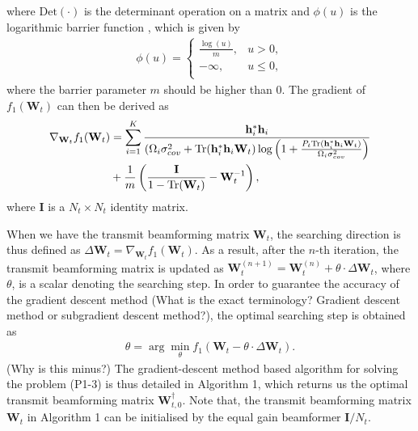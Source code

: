 \documentclass[12pt,draftcls,onecolumn,journal]{IEEEtran}
\begin{document}
where $\text{Det}(\cdot)$ is the determinant operation on a matrix and $\phi(u)$ is the logarithmic barrier function \cite{convex}, which is given by
\begin{align}
	\phi(u)=\left\{
	\begin{array}{ll}
		\displaystyle{\frac{\log(u)}{m}}, & u > 0, \\
		-\infty, & u \leq 0, \\
	\end{array}
	\right. \label{eq:Barrier}
\end{align}
where the barrier parameter $m$ should be higher than 0. The gradient of $f_1(\mathbf{W}_t)$ can then be derived as
\begin{align}
	\nabla_{\mathbf{W}_t}f_1(\mathbf{W}_t) & = \sum_{i=1}^K\frac{\mathbf{h}_i^*\mathbf{h}_i}{(\Omega_i\sigma_{cov}^2 + \text{Tr}(\mathbf{h}_i^*\mathbf{h}_i\mathbf{W}_t)\log\left(1 + \frac{P_t\text{Tr}(\mathbf{h}_i^*\mathbf{h}_i\mathbf{W}_t)}{\Omega_i\sigma_{cov}^2}\right)} \notag \\
& + \frac{1}{m}\left(\frac{\mathbf{I}}{1 - \text{Tr}(\mathbf{W}_t)} - \mathbf{W}_t^{-1}\right), \label{eq:GradientF1}
\end{align}
where $\mathbf{I}$ is a $N_t\times N_t$ identity matrix.

When we have the transmit beamforming matrix $\mathbf{W}_t$, the searching direction is thus defined as $\Delta \mathbf{W}_t =\nabla_{\mathbf{W}_t}f_1(\mathbf{W}_t)$. As a result, after the $n$-th iteration, the transmit beamforming matrix is updated as $\mathbf{W}_t^{(n+1)} = \mathbf{W}_t^{(n)} + \theta\cdot \Delta \mathbf{W}_t$, where $\theta$, \cbstart is a scalar denoting the searching step.  In order to guarantee the accuracy of the gradient descent method {\color{red} (What is the exact terminology? Gradient descent method or subgradient descent method?)}, the optimal searching step is obtained as
\begin{align}
	\theta = \arg \min_{\theta} f_1(\mathbf{W}_t - \theta\cdot \Delta \mathbf{W}_t). \label{eq:SearchStepF1}
\end{align}
{\color{red} (Why is this minus?)} The gradient-descent method based algorithm for solving the problem (P1-3) is thus detailed in Algorithm 1, which returns us the optimal transmit beamforming matrix $\mathbf{W}_{t,0}^{\dagger}$. Note that, the transmit beamforming matrix $\mathbf{W}_{t}$ in Algorithm 1 can be initialised by the equal gain beamformer $\mathbf{I} / N_t$.
\end{document}
